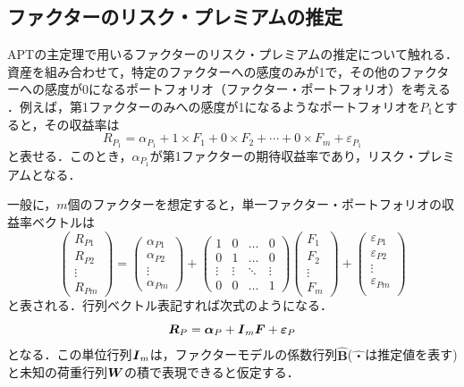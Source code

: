 ﻿\documentclass[11pt]{jreport}
\begin{document}
\subsection{ファクターのリスク・プレミアムの推定}
APTの主定理で用いるファクターのリスク・プレミアムの推定について触れる．
資産を組み合わせて，特定のファクターへの感度のみが1で，その他のファクターへの感度が0になるポートフォリオ（ファクター・ポートフォリオ）を考える ．例えば，第1ファクターのみへの感度が1になるようなポートフォリオを$P_1$とすると，その収益率は
\begin{equation}
R_{P_1} = \alpha_{P_1} + 1\times F_1 + 0\times F_2 + \cdots + 0\times F_m + \varepsilon_{P_1} 
\end{equation}
と表せる．このとき，$\alpha_{P_1}$が第1ファクターの期待収益率であり，リスク・プレミアムとなる．

一般に，$m$個のファクターを想定すると，単一ファクター・ポートフォリオの収益率ベクトルは
\begin{equation}
\left(
	\begin{array}{cccc}
	R_{P1}\\
	R_{P2}\\
	\vdots \\
	R_{Pm}
	\end{array}
\right)
=
\left(
	\begin{array}{cccc}
	\alpha_{P1}\\
	\alpha_{P2}\\
	\vdots \\
	\alpha_{Pm}
	\end{array}
\right)
+
\left(
	\begin{array}{cccc}
	1 & 0 & \ldots & 0\\
	0 & 1 & \ldots & 0\\
	\vdots & \vdots & \ddots & \vdots \\
	0 & 0 & \ldots & 1
	\end{array}
\right)
\left(
	\begin{array}{cccc}
	F_1 \\
	F_2 \\
	\vdots \\
	F_m
	\end{array}
\right)
+
\left(
	\begin{array}{cccc}
	\varepsilon_{P1}\\
	\varepsilon_{P2}\\
	\vdots \\
	\varepsilon_{Pm}\\
	\end{array}
\right)
\end{equation}
と表される．行列ベクトル表記すれば次式のようになる．
\begin{equation}
\mbox{\boldmath $R$}_P = \mbox{\boldmath $\alpha$}_P + \mbox{\boldmath $I$}_m\mbox{\boldmath $F$} + \mbox{\boldmath $\varepsilon$}_P
\end{equation}
となる．この単位行列$\mbox{\boldmath $I$}_m$は，ファクターモデルの係数行列$\hat{\bm{B}}$($\hat{・}$は推定値を表す)と未知の荷重行列$\mbox{\boldmath $W$}$の積で表現できると仮定する．
\end{document}
